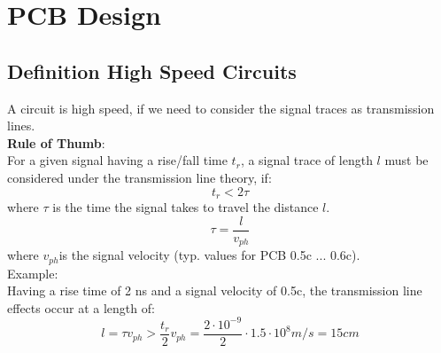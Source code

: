 \section{PCB Design}

	\subsection{Definition High Speed Circuits}
		A circuit is high speed, if we need to consider the signal traces as transmission lines. \\
		\textbf{Rule of Thumb}:\\
		For a given signal having a rise/fall time $t_r$, a signal trace of length $l$ must be considered under the transmission line theory, if:
		\begin{equation}
			t_r < 2\tau 
		\end{equation}
		where $\tau$ is the time the signal takes to travel the distance $l$. 
		\begin{equation}
			\tau = \frac{l}{v_{ph}} 
		\end{equation}		
		where $v_{ph}$is the signal velocity (typ. values for PCB 0.5c ... 0.6c).\\
		Example: \\
		Having a rise time of 2 ns and a signal velocity of 0.5c, the transmission line effects occur at a length of: 
		\begin{equation}
			l = \tau v_{ph} > \frac{t_r}{2}v_{ph} = \frac{2\cdot 10^{-9}}{2}\cdot 1.5 \cdot 10^8 m/s = 15 cm
		\end{equation}	
